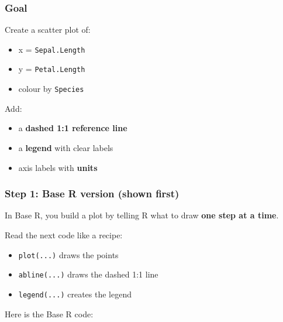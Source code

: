 \documentclass[
  letterpaper,
  DIV=11,
  numbers=noendperiod]{scrartcl}
\providecommand{\tightlist}{%
  \setlength{\itemsep}{0pt}\setlength{\parskip}{0pt}}\usepackage{longtable,booktabs,array}
\begin{document}
\subsubsection{Goal}\label{goal}

Create a scatter plot of:

\begin{itemize}
\tightlist
\item
  x = \texttt{Sepal.Length}
\item
  y = \texttt{Petal.Length}
\item
  colour by \texttt{Species}
\end{itemize}

Add:

\begin{itemize}
\tightlist
\item
  a \textbf{dashed 1:1 reference line}
\item
  a \textbf{legend} with clear labels
\item
  axis labels with \textbf{units}
\end{itemize}

\subsubsection{Step 1: Base R version (shown
first)}\label{step-1-base-r-version-shown-first}

In Base R, you build a plot by telling R what to draw \textbf{one step
at a time}.

Read the next code like a recipe:

\begin{itemize}
\tightlist
\item
  \texttt{plot(...)} draws the points
\item
  \texttt{abline(...)} draws the dashed 1:1 line
\item
  \texttt{legend(...)} creates the legend
\end{itemize}

Here is the Base R code:
\end{document}
